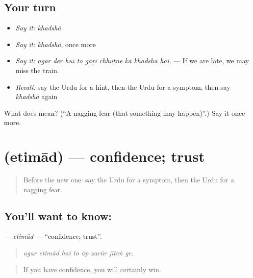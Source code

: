 \subsection*{Your turn}
\begin{itemize}
\raggedright
  \item \emph{Say it:} \emph{khadshā}
  \item \emph{Say it:} \emph{khadshā}, once more
  \item \emph{Say it:} \emph{agar der huī to gāṛī chhūṭne kā khadshā hai.} — If we are late, we may miss the train.
  \item \emph{Recall:} say the Urdu for a hint, then the Urdu for a symptom, then say \emph{khadshā} again
\end{itemize}

\begin{tcolorbox}[breakable,colback=teal!4,colframe=teal!35!black,title={Before you move on}]
What does  mean? (\textquotedblleft{}A nagging fear (that something may happen)\textquotedblright{}.) Say it once more.
\end{tcolorbox}
\section[\texorpdfstring{\ur{اعتماد} (etimād)}{اعتماد (etimād)}]{ (etimād) — confidence; trust}

\label{lesson:UR-C363-etimad}



\begin{quote}
Before the new one: say the Urdu for a symptom, then the Urdu for a nagging fear.
\end{quote}

\subsection*{You'll want to know: }
\textbf{} — \emph{etimād} — \textquotedblleft{}confidence; trust\textquotedblright{}.

\begin{quote}
       
\end{quote}

\begin{quote}
\emph{agar etimād hai to āp zarūr jīteṅ ge.}
\end{quote}

\begin{quote}
If you have confidence, you will certainly win.
\end{quote}

